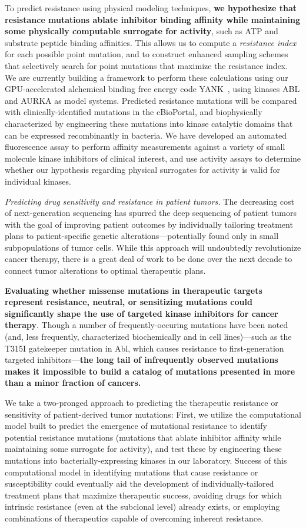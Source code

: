 \documentclass[10pt]{article}
\begin{document}
To predict resistance using physical modeling techniques, {\bf we hypothesize that resistance mutations ablate inhibitor binding affinity while maintaining some physically computable surrogate for activity}, such as ATP and substrate peptide binding affinities.
This allows us to compute a \emph{resistance index} for each possible point mutation, and to construct enhanced sampling schemes that selectively search for point mutations that maximize the resistance index.
We are currently building a framework to perform these calculations using our GPU-accelerated alchemical binding free energy code YANK~\cite{yank}, using kinases ABL and AURKA as model systems.
Predicted resistance mutations will be compared with clinically-identified mutations in the cBioPortal, and biophysically characterized by engineering these mutations into kinase catalytic domains that can be expressed recombinantly in bacteria.
We have developed an automated fluorescence assay to perform affinity measurements against a variety of small molecule kinase inhibitors of clinical interest, and use activity assays to determine whether our hypothesis regarding physical surrogates for activity is valid for individual kinases.

\emph{Predicting drug sensitivity and resistance in patient tumors.}
The decreasing cost of next-generation sequencing has spurred the deep sequencing of patient tumors with the goal of improving patient outcomes by individually tailoring treatment plans to patient-specific genetic alterations---potentially found only in small subpopulations of tumor cells.
While this approach will undoubtedly revolutionize cancer therapy, there is a great deal of work to be done over the next decade to connect tumor alterations to optimal therapeutic plans.

{\bf Evaluating whether missense mutations in therapeutic targets represent resistance, neutral, or sensitizing mutations could significantly shape the use of targeted kinase inhibitors for cancer therapy}.
Though a number of frequently-occuring  mutations have been noted (and, less frequently, characterized biochemically and in cell lines)---such as the T315I gatekeeper mutation in Abl, which causes resistance to first-generation targeted inhibitors---{\bf the long tail of infrequently observed mutations makes it impossible to build a catalog of mutations presented in more than a minor fraction of cancers.}

We take a two-pronged approach to predicting the therapeutic resistance or sensitivity of patient-derived tumor mutations:
First, we utilize the computational model built to predict the emergence of mutational resistance to identify potential resistance mutations (mutations that ablate inhibitor affinity while maintaining some surrogate for activity), and test these by engineering these mutations into bacterially-expressing kinases in our laboratory.
Success of this computational model in identifying mutations that cause resistance or susceptibility could eventually aid the development of individually-tailored treatment plans that maximize therapeutic success, avoiding drugs for which intrinsic resistance (even at the subclonal level) already exists, or employing combinations of therapeutics capable of overcoming inherent resistance.
\end{document}
